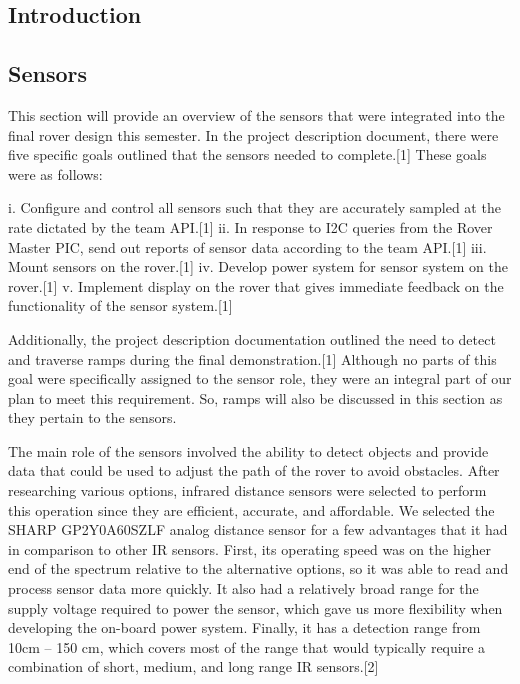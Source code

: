




\usepackage[compact]{titlesec}





\subsection{Introduction}

\subsection{Sensors}

This section will provide an overview of the sensors that were integrated into the final rover design this semester.  In the project description document, there were five specific goals outlined that the sensors needed to complete.[1]  These goals were as follows: 

  i.	Configure and control all sensors such that they are accurately sampled at the rate dictated by the team API.[1]
  ii.	In response to I2C queries from the Rover Master PIC, send out reports of sensor data according to the team API.[1]
  iii.	Mount sensors on the rover.[1]
  iv.	Develop power system for sensor system on the rover.[1]
  v.	Implement display on the rover that gives immediate feedback on the functionality of the sensor system.[1]
  
Additionally, the project description documentation outlined the need to detect and traverse ramps during the final demonstration.[1]  Although no parts of this goal were specifically assigned to the sensor role, they were an integral part of our plan to meet this requirement.  So, ramps will also be discussed in this section as they pertain to the sensors.

The main role of the sensors involved the ability to detect objects and provide data that could be used to adjust the path of the rover to avoid obstacles.  After researching various options, infrared distance sensors were selected to perform this operation since they are efficient, accurate, and affordable.  We selected the SHARP GP2Y0A60SZLF analog distance sensor for a few advantages that it had in comparison to other IR sensors.  First, its operating speed was on the higher end of the spectrum relative to the alternative options, so it was able to read and process sensor data more quickly.  It also had a relatively broad range for the supply voltage required to power the sensor, which gave us more flexibility when developing the on-board power system.  Finally, it has a detection range from 10cm – 150 cm, which covers most of the range that would typically require a combination of short, medium, and long range IR sensors.[2]  

